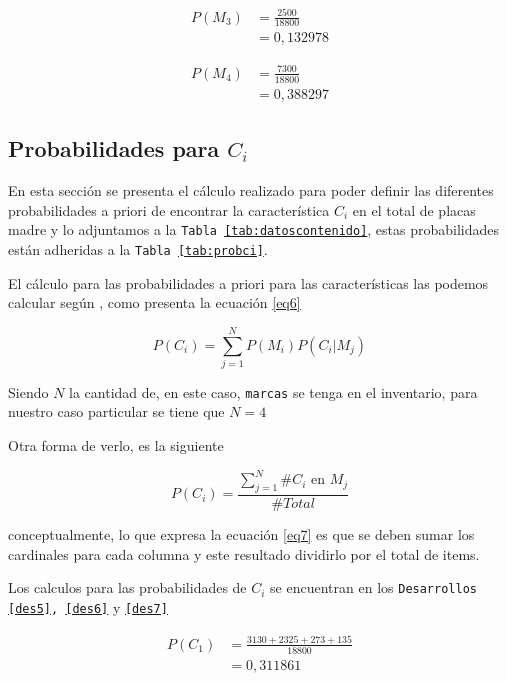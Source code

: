 \documentclass{article}
\begin{document}
\begin{equation} \label{des3}
\begin{split}
 P(M_{3}) & =  \frac{2500}{18800} \\
 & = 0,132978
\end{split}
\end{equation}

\begin{equation} \label{des4}
\begin{split}
 P(M_{4}) & =  \frac{7300}{18800} \\
 & = 0,388297
\end{split}
\end{equation}

\subsection*{Probabilidades para \texttt{$C_{i}$}}
En esta secci\'on se presenta el c\'alculo realizado para poder definir las
diferentes probabilidades a priori de encontrar la caracter\'istica $C_{i}$ en el total
de placas madre y lo adjuntamos a la \texttt{Tabla \ref{tab:datoscontenido}},
estas probabilidades est\'an adheridas a la \texttt{Tabla \ref{tab:probci}}.

El c\'alculo para las probabilidades a priori para las  caracter\'isticas las
podemos calcular seg\'un \cite{sebpia2018}, como presenta la ecuaci\'on
\ref{eq6}

\begin{equation} \label{eq6}
P(C_{i})=\sum_{j=1}^{N}P(M_{i})P(C_{i}|M_{j})
\end{equation}

Siendo $N$ la cantidad de, en este caso, \texttt{marcas} se tenga en el
inventario, para nuestro caso particular se tiene que $N=4$

Otra forma de verlo, es la siguiente

\begin{equation} \label{eq7}
P(C_{i})=\frac{\sum_{j=1}^{N} \#C_{i}\text{ en }M_{j}}{\#Total}
\end{equation}

conceptualmente, lo que expresa la ecuaci\'on \ref{eq7} es que se deben sumar
los cardinales para cada columna y este resultado dividirlo por el total de
items.

Los calculos para las probabilidades de $C_{i}$ se encuentran en los
\texttt{Desarrollos \ref{des5}, \ref{des6}} y \texttt{\ref{des7}}

\begin{equation} \label{des5}
\begin{split}
 P(C_{1}) & =  \frac{3130 + 2325 + 273 + 135}{18800} \\
 & = 0,311861
\end{split}
\end{equation}
\end{document}
